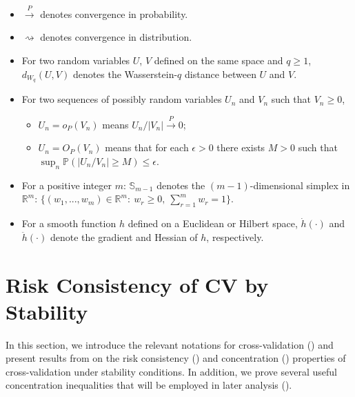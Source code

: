 \documentclass[11pt]{article}
\theoremstyle{plain}
\begin{document}
\begin{itemize}
\begin{itemize}
        \item $a_n\asymp b_n$ means $|a_n|\lesssim b_n \lesssim |a_n|$;
        \item $a_n=\tilde o(b_n)$ means $|a_n|=o(b_n\cdot c_n)$, where $c_n$ is a finite-degree polynomial of $\log n$ and perhaps the logarithm of other model quantities such as the dimensionality of the data and/or the number of models being compared.
    \end{itemize}
    \item $\stackrel{P}{\rightarrow}$ denotes convergence in probability.
    \item $\rightsquigarrow$ denotes convergence in distribution.
    \item For two random variables $U$, $V$ defined on the same space and $q\ge 1$, $d_{W_q}(U,V)$ denotes the Wasserstein-$q$ distance between $U$ and $V$.
\item For two sequences of possibly random variables $U_n$ and $V_n$ such that $V_n\ge 0$,
\begin{itemize}
    \item $U_n=o_P(V_n)$ means $U_n/|V_n|\stackrel{P}{\rightarrow}0$;
    \item $U_n=O_P(V_n)$ means that for each $\epsilon>0$ there exists $M>0$ such that $\sup_n \mathbb P(|U_n/V_n|\ge M)\le \epsilon$.
\end{itemize}
    \item For a positive integer $m$: $\mathbb S_{m-1}$ denotes the $(m-1)$-dimensional simplex in $\mathbb R^m$: $\{(w_1,...,w_m)\in \mathbb R^m:~w_r\ge 0,~\sum_{r=1}^m w_r=1\}$.
    \item For a smooth function $h$ defined on a Euclidean or Hilbert space, $\dot h(\cdot)$ and $\ddot h(\cdot)$ denote the gradient and Hessian of $h$, respectively.
\end{itemize}

\newpage


\section{Risk Consistency of CV by Stability}\label{sec:bousquet}
In this section, we introduce the relevant notations for cross-validation () and present results from \cite{bousquet2002stability} on the risk consistency () and concentration () properties of cross-validation under stability conditions. In addition, we prove several useful concentration inequalities that will be employed in later analysis ().
\end{document}
